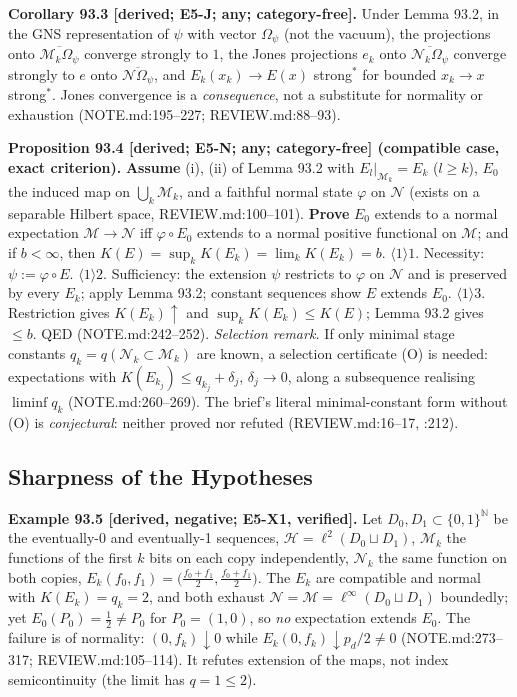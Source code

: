 \textbf{Corollary 93.3 [derived; E5-J; any; category-free].}  Under Lemma 93.2, in the GNS representation of \(\psi\)
with vector \(\Omega_\psi\) (not the vacuum), the projections onto \(\overline{\mathcal M_k\Omega_\psi}\) converge strongly to
\(1\), the Jones projections \(e_k\) onto \(\overline{\mathcal N_k\Omega_\psi}\) converge strongly to \(e\) onto
\(\overline{\mathcal N\Omega_\psi}\), and \(E_k(x_k)\to E(x)\) strong\(^*\) for bounded \(x_k\to x\) strong\(^*\).  Jones convergence is a
\emph{consequence}, not a substitute for normality or exhaustion (NOTE.md:195--227; REVIEW.md:88--93).

\textbf{Proposition 93.4 [derived; E5-N; any; category-free] (compatible case, exact criterion).}  \textbf{Assume}
(i), (ii) of Lemma 93.2 with \(E_l|_{\mathcal M_k}=E_k\) (\(l\ge k\)), \(E_0\) the induced map on
\(\bigcup_k\mathcal M_k\), and a faithful normal state \(\varphi\) on \(\mathcal N\) (exists on a separable Hilbert space,
REVIEW.md:100--101).  \textbf{Prove} \(E_0\) extends to a normal expectation \(\mathcal M\to\mathcal N\) iff \(\varphi\circ E_0\)
extends to a normal positive functional on \(\mathcal M\); and if \(b<\infty\), then \(K(E)=\sup_kK(E_k)=\lim_kK(E_k)=b\).
\(\langle1\rangle1\). Necessity: \(\psi:=\varphi\circ E\).  \(\langle1\rangle2\). Sufficiency: the extension \(\psi\) restricts to
\(\varphi\) on \(\mathcal N\) and is preserved by every \(E_k\); apply Lemma 93.2; constant sequences show \(E\) extends \(E_0\).
\(\langle1\rangle3\). Restriction gives \(K(E_k)\uparrow\) and \(\sup_kK(E_k)\le K(E)\); Lemma 93.2 gives \(\le b\).  QED (NOTE.md:242--252).
\emph{Selection remark.}  If only minimal stage constants \(q_k=q(\mathcal N_k\subset\mathcal M_k)\) are known, a selection
certificate (O) is needed: expectations with \(K(E_{k_j})\le q_{k_j}+\delta_j\), \(\delta_j\to0\), along a subsequence realising
\(\liminf q_k\) (NOTE.md:260--269).  The brief's literal minimal-constant form without (O) is \emph{conjectural}: neither
proved nor refuted (REVIEW.md:16--17, :212).

\subsection{Sharpness of the Hypotheses}

\textbf{Example 93.5 [derived, negative; E5-X1, verified].}  Let \(D_0,D_1\subset\{0,1\}^{\mathbb N}\) be the eventually-0 and
eventually-1 sequences, \(\mathcal H=\ell^2(D_0\sqcup D_1)\), \(\mathcal M_k\) the functions of the first \(k\) bits on each copy
independently, \(\mathcal N_k\) the same function on both copies, \(E_k(f_0,f_1)=\big(\tfrac{f_0+f_1}2,\tfrac{f_0+f_1}2\big)\).  The
\(E_k\) are compatible and normal with \(K(E_k)=q_k=2\), and both exhaust \(\mathcal N=\mathcal M=\ell^\infty(D_0\sqcup D_1)\)
boundedly; yet \(E_0(P_0)=\tfrac12\ne P_0\) for \(P_0=(1,0)\), so \emph{no} expectation extends \(E_0\).  The failure is of
normality: \((0,f_k)\downarrow0\) while \(E_k(0,f_k)\downarrow p_d/2\ne0\) (NOTE.md:273--317; REVIEW.md:105--114).  It refutes
extension of the maps, not index semicontinuity (the limit has \(q=1\le2\)).

